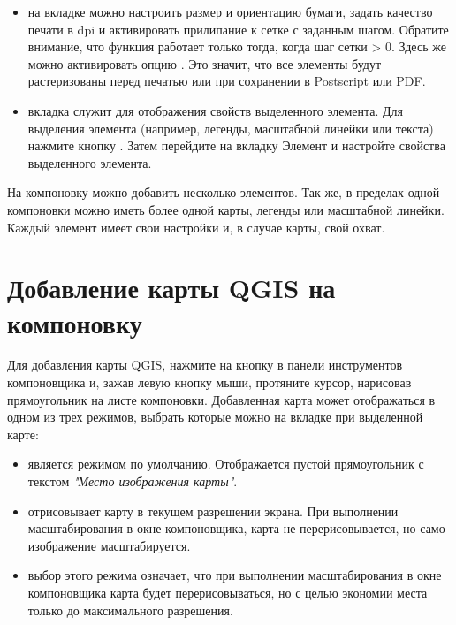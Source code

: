 \begin{itemize}[label=--]
\item на вкладке  можно настроить размер и ориентацию бумаги,
задать качество печати в dpi и активировать прилипание к сетке с заданным
шагом. Обратите внимание, что функция 
работает только тогда, когда шаг сетки > 0. Здесь же можно активировать
опцию . Это значит, что все элементы будут
растеризованы перед печатью или при сохранении в Postscript или PDF.
\item вкладка  служит для отображения свойств выделенного
элемента. Для выделения элемента (например, легенды, масштабной линейки
или текста) нажмите кнопку . Затем перейдите на вкладку Элемент и настройте свойства
выделенного элемента.
\end{itemize}

На компоновку можно добавить несколько элементов. Так же, в пределах
одной компоновки можно иметь более одной карты, легенды или масштабной
линейки. Каждый элемент имеет свои настройки и, в случае карты, свой
охват.

\section{Добавление карты QGIS на компоновку}

Для добавления карты QGIS, нажмите на кнопку
 в панели инструментов
компоновщика и, зажав левую кнопку мыши, протяните курсор, нарисовав
прямоугольник на листе компоновки. Добавленная карта может отображаться
в одном из трех режимов, выбрать которые можно на вкладке 
при выделенной карте:

\begin{itemize}[label=--]
\item {} является режимом по
умолчанию. Отображается пустой прямоугольник с текстом
\textit{"Место изображения карты"}.
\item {} отрисовывает карту в текущем
разрешении экрана. При выполнении масштабирования в окне компоновщика,
карта не перерисовывается, но само изображение масштабируется.
\item {} выбор этого режима
означает, что при выполнении масштабирования в окне компоновщика карта
будет перерисовываться, но с целью экономии места только до
максимального разрешения.
\end{itemize}

